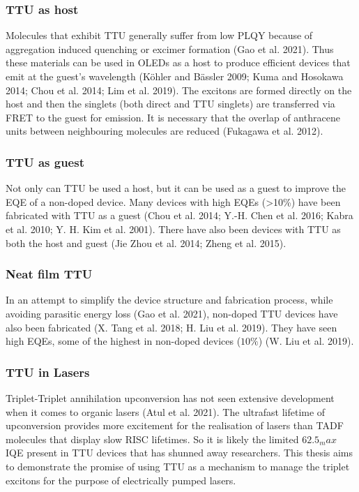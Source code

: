 \documentclass[
  letterpaper,
  DIV=11,
  numbers=noendperiod,
  oneside]{scrreprt}
\begin{document}
\hypertarget{ttu-as-host}{%
\subsubsection{TTU as host}\label{ttu-as-host}}

Molecules that exhibit TTU generally suffer from low PLQY because of
aggregation induced quenching or excimer formation (Gao et al. 2021).
Thus these materials can be used in OLEDs as a host to produce efficient
devices that emit at the guest's wavelength (Köhler and Bässler 2009;
Kuma and Hosokawa 2014; Chou et al. 2014; Lim et al. 2019). The excitons
are formed directly on the host and then the singlets (both direct and
TTU singlets) are transferred via FRET to the guest for emission. It is
necessary that the overlap of anthracene units between neighbouring
molecules are reduced (Fukagawa et al. 2012).

\hypertarget{ttu-as-guest}{%
\subsubsection{TTU as guest}\label{ttu-as-guest}}

Not only can TTU be used a host, but it can be used as a guest to
improve the EQE of a non-doped device. Many devices with high EQEs
(\textgreater10\%) have been fabricated with TTU as a guest (Chou et al.
2014; Y.-H. Chen et al. 2016; Kabra et al. 2010; Y. H. Kim et al. 2001).
There have also been devices with TTU as both the host and guest (Jie
Zhou et al. 2014; Zheng et al. 2015).

\hypertarget{neat-film-ttu}{%
\subsubsection{Neat film TTU}\label{neat-film-ttu}}

In an attempt to simplify the device structure and fabrication process,
while avoiding parasitic energy loss (Gao et al. 2021), non-doped TTU
devices have also been fabricated (X. Tang et al. 2018; H. Liu et al.
2019). They have seen high EQEs, some of the highest in non-doped
devices (\(10\%\)) (W. Liu et al. 2019).

\hypertarget{ttu-in-lasers}{%
\subsubsection{TTU in Lasers}\label{ttu-in-lasers}}

Triplet-Triplet annihilation upconversion has not seen extensive
development when it comes to organic lasers (Atul et al. 2021). The
ultrafast lifetime of upconversion provides more excitement for the
realisation of lasers than TADF molecules that display slow RISC
lifetimes. So it is likely the limited \(62.5_max\) IQE present in TTU
devices that has shunned away researchers. This thesis aims to
demonstrate the promise of using TTU as a mechanism to manage the
triplet excitons for the purpose of electrically pumped lasers.
\end{document}

